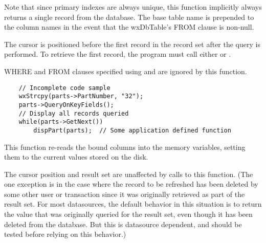 Note that since primary indexes are always unique, this function implicitly 
always returns a single record from the database. The base table name is 
prepended to the column names in the event that the wxDbTable's FROM clause 
is non-null.




The cursor is positioned before the first record in the record set after 
the query is performed.  To retrieve the first record, the program must call 
either  or 
.

WHERE and FROM clauses specified using  
and  are ignored by 
this function.


\begin{verbatim}
    // Incomplete code sample
    wxStrcpy(parts->PartNumber, "32");
    parts->QueryOnKeyFields();
    // Display all records queried
    while(parts->GetNext())
        dispPart(parts);  // Some application defined function
\end{verbatim}


\label{wxdbtablerefresh}


This function re-reads the bound columns into the memory variables, setting 
them to the current values stored on the disk.

The cursor position and result set are unaffected by calls to this function.
(The one exception is in the case where the record to be refreshed has been 
deleted by some other user or transaction since it was originally retrieved 
as part of the result set.  For most datasources, the default behavior in 
this situation is to return the value that was originally queried for the 
result set, even though it has been deleted from the database.  But this is 
datasource dependent, and should be tested before relying on this behavior.)

